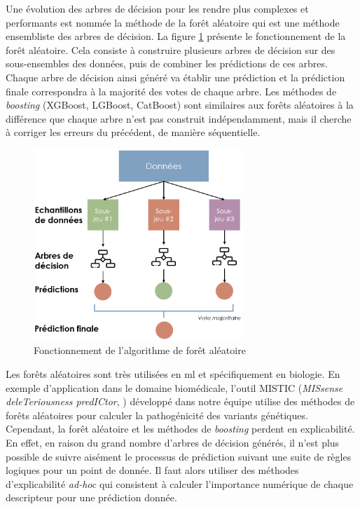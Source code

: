 Une évolution des arbres de décision pour les rendre plus complexes et performants est nommée la méthode de la forêt aléatoire qui est une méthode ensembliste des arbres de décision. La figure \ref{fig:random-forest} présente le fonctionnement de la forêt aléatoire. Cela consiste à construire plusieurs arbres de décision sur des sous-ensembles des données, puis de combiner les prédictions de ces arbres. Chaque arbre de décision ainsi généré va établir une prédiction et la prédiction finale correspondra à la majorité des votes de chaque arbre. Les méthodes de \textit{boosting}  (XGBoost, LGBoost, CatBoost) sont similaires aux forêts aléatoires à la différence que chaque arbre n'est pas construit indépendamment, mais il cherche à corriger les erreurs du précédent, de manière séquentielle.
\begin{figure}[!ht]
 \centering
 \includegraphics[width=0.7\textwidth]{figures/random_forest.png}
 \caption[Fonctionnement de l'algorithme de forêt aléatoire]{Fonctionnement de l'algorithme de forêt aléatoire}
 \label{fig:random-forest}
\end{figure}
Les forêts aléatoires sont très utilisées en \gls{ml} et spécifiquement en biologie. En exemple d'application dans le domaine biomédicale, l'outil MISTIC (\textit{MISsense deleTeriousness predICtor}, \cite{chennen_mistic_2020}) développé dans notre équipe utilise des méthodes de forêts aléatoires pour calculer la pathogénicité des variants génétiques. Cependant, la forêt aléatoire et les méthodes de \textit{boosting} perdent en explicabilité. En effet, en raison du grand nombre d'arbres de décision générés, il n'est plus possible de suivre aisément le processus de prédiction suivant une suite de règles logiques pour un point de donnée. Il faut alors utiliser des méthodes d'explicabilité \textit{ad-hoc} qui consistent à calculer l'importance numérique de chaque descripteur pour une prédiction donnée.

